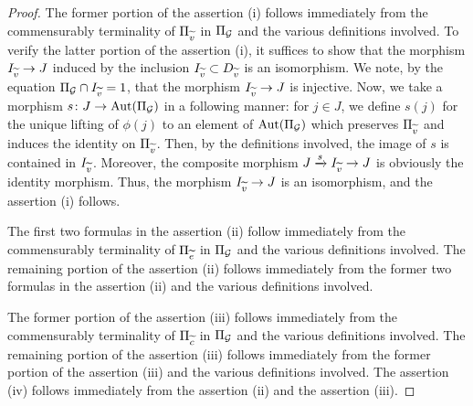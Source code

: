 \begin{proof}
  The former portion of the assertion (i) follows immediately from the commensurably terminality of $\Pi_{\widetilde{v}}$ in $\Pi_{\mathcal{G}}$ and the various definitions involved. To verify the latter portion of the assertion (i), it suffices to show that the morphism $I_{\widetilde{v}} \to J$ induced by the inclusion $I_{\widetilde{v}} \subset D_{\widetilde{v}}$ is an isomorphism. We note, by the equation $\Pi_{\mathcal{G}} \cap I_{\widetilde{v}} = 1$, that the morphism $I_{\widetilde{v}} \to J$ is injective. Now, we take a morphism $s \colon J \to \mathrm{Aut}(\Pi_{\mathcal{G}})$ in a following manner: for $j \in J$, we define $s(j)$ for the unique lifting of $\phi(j)$ to an element of $\mathrm{Aut}(\Pi_{\mathcal{G}})$ which preserves $\Pi_{\widetilde{v}}$ and induces the identity on $\Pi_{\widetilde{v}}$. Then, by the definitions involved, the image of $s$ is contained in $I_{\widetilde{v}}$. Moreover, the composite morphism $J \xrightarrow{s} I_{\widetilde{v}} \to J$ is obviously the identity morphism. Thus, the morphism $I_{\widetilde{v}} \to J$ is an isomorphism, and the assertion (i) follows.
  
  The first two formulas in the assertion (ii) follow immediately from the commensurably terminality of $\Pi_{\widetilde{e}}$ in $\Pi_{\mathcal{G}}$ and the various definitions involved. The remaining portion of the assertion (ii) follows immediately from the former two formulas in the assertion (ii) and the various definitions involved.

  The former portion of the assertion (iii) follows immediately from the commensurably terminality of $\Pi_{\widetilde{c}}$ in $\Pi_{\mathcal{G}}$ and the various definitions involved. The remaining portion of the assertion (iii) follows immediately from the former portion of the assertion (iii) and the various definitions involved. The assertion (iv) follows immediately from the assertion (ii) and the assertion (iii).
\end{proof}

